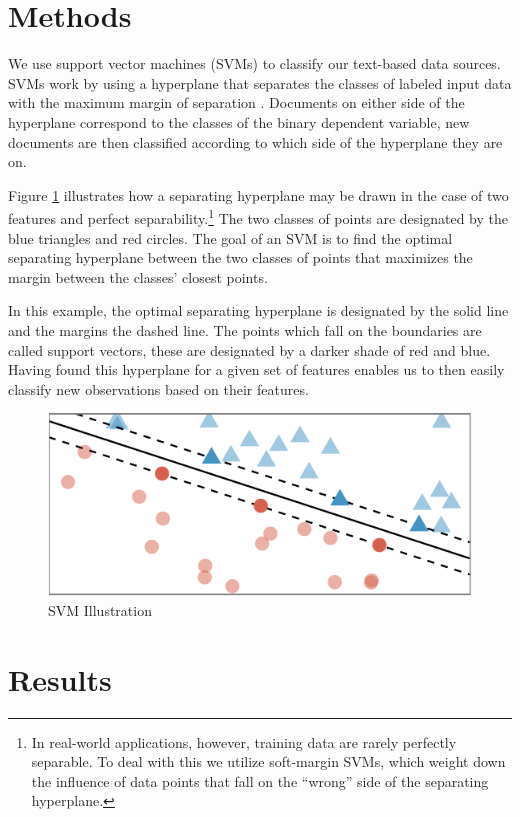 \documentclass[pdftex,12pt,fullpage,oneside]{amsart}
\begin{document}
\section{Methods}

We use support vector machines (SVMs) to classify our text-based data sources. SVMs work by using a hyperplane that separates the classes of labeled input data with the maximum margin of separation \citep{vapnik2000nature,chang2011libsvm}. Documents on either side of the hyperplane correspond to the classes of the binary dependent variable, new documents are then classified according to which side of the hyperplane they are on.

Figure \ref{fig:svmIntro} illustrates how a separating hyperplane may be drawn in the case of two features and perfect separability.\footnote{In real-world applications, however, training data are rarely perfectly separable. To deal with this we utilize soft-margin SVMs, which weight down the influence of data points that fall on the ``wrong'' side of the separating hyperplane.} The two classes of points are designated by the blue triangles and red circles. The goal of an SVM is to find the optimal separating hyperplane between the two classes of points that maximizes the margin between the classes' closest points. 

In this example, the optimal separating hyperplane is designated by the solid line and the margins the dashed line. The points which fall on the boundaries are called support vectors, these are designated by a darker shade of red and blue. Having found this hyperplane for a given set of features enables us to then easily classify new observations based on their features. 

\begin{figure}[ht]
	\centering
	\includegraphics[width=.5\textwidth]{svmIntro}
	\caption{SVM Illustration}
	\label{fig:svmIntro}
\end{figure}
\FloatBarrier

\section{Results}
\end{document}
